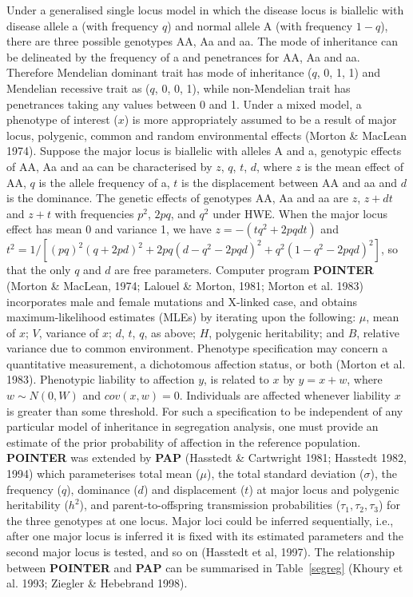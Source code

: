 Under a generalised single locus model in which the disease locus is biallelic
with disease allele a (with frequency $q$) and normal allele A (with frequency
$1-q$), there are three possible genotypes AA, Aa and aa.  The mode of
inheritance can be delineated by the frequency of a and penetrances for AA, Aa
and aa.  Therefore Mendelian dominant trait has mode of inheritance ($q$, 0, 1,
1) and Mendelian recessive trait as ($q$, 0, 0, 1), while non-Mendelian trait
has penetrances taking any values between 0 and 1.  Under a mixed model, a
phenotype of interest ($x$) is more appropriately assumed to be a result of
major locus, polygenic, common and random environmental effects (Morton \&
MacLean 1974).  Suppose the major locus is biallelic with alleles A and a,
genotypic effects of AA, Aa and aa can be characterised by $z$, $q$, $t$, $d$,
where $z$ is the mean effect of AA, $q$ is the allele frequency of a, $t$ is
the displacement between AA and aa and $d$ is the dominance.  The genetic
effects of genotypes AA, Aa and aa are $z$, $z+dt$ and $z+t$ with frequencies
$p^2$, $2pq$, and $q^2$ under HWE.  When the major locus effect has mean 0 and
variance 1, we have $z=-(tq^2+2pqdt)$ and
$t^2=1/[(pq)^2(q+2pd)^2+2pq(d-q^2-2pqd)^2+q^2(1-q^2-2pqd)^2]$, so that the only
$q$ and $d$ are free parameters.  Computer program {\bf POINTER} (Morton \&
MacLean, 1974; Lalouel \& Morton, 1981; Morton et al.  1983) incorporates male
and female mutations and X-linked case, and obtains maximum-likelihood
estimates (MLEs) by iterating upon the following:  $\mu$, mean of $x$; $V$,
variance of $x$; $d$, $t$, $q$, as above; $H$, polygenic heritability; and $B$,
relative variance due to common environment.  Phenotype specification may
concern a quantitative measurement, a dichotomous affection status, or both
(Morton et al.  1983).  Phenotypic liability to affection ${y}$, is related to
${x}$ by ${y}={x}+{w}$, where ${w}\sim N(0,W)$ and $cov({x},{w})=0$.
Individuals are affected whenever liability $x$ is greater than some threshold.
For such a specification to be independent of any particular model of
inheritance in segregation analysis, one must provide an estimate of the prior
probability of affection in the reference population.  {\bf POINTER} was
extended by {\bf PAP} (Hasstedt \& Cartwright 1981; Hasstedt 1982, 1994) which
parameterises total mean ($\mu$), the total standard deviation ($\sigma$), the
frequency ($q$), dominance ($d$) and displacement ($t$) at major locus and
polygenic heritability ($h^2$), and parent-to-offspring transmission
probabilities ($\tau_1, \tau_2, \tau_3$) for the three genotypes at one locus.
Major loci could be inferred sequentially, i.e., after one major locus is
inferred it is fixed with its estimated parameters and the second major locus
is tested, and so on (Hasstedt et al, 1997).  The relationship between {\bf
POINTER} and {\bf PAP} can be summarised in Table~\ref{segreg} (Khoury et al.
1993; Ziegler \& Hebebrand 1998).

